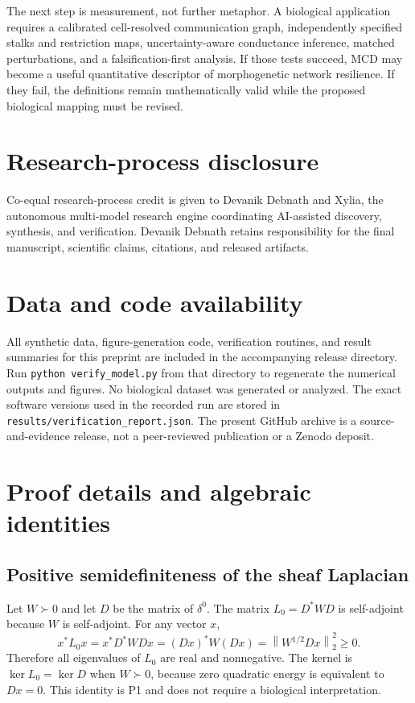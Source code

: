 \documentclass[12pt,a4paper]{article}
\newcommand{\norm}[1]{\left\lVert #1 \right\rVert}
\begin{document}
The next step is measurement, not further metaphor. A biological application requires a calibrated cell-resolved communication graph, independently specified stalks and restriction maps, uncertainty-aware conductance inference, matched perturbations, and a falsification-first analysis. If those tests succeed, MCD may become a useful quantitative descriptor of morphogenetic network resilience. If they fail, the definitions remain mathematically valid while the proposed biological mapping must be revised.

\section*{Research-process disclosure}
Co-equal research-process credit is given to Devanik Debnath and Xylia, the autonomous multi-model research engine coordinating AI-assisted discovery, synthesis, and verification. Devanik Debnath retains responsibility for the final manuscript, scientific claims, citations, and released artifacts.

\section*{Data and code availability}
All synthetic data, figure-generation code, verification routines, and result summaries for this preprint are included in the accompanying release directory. Run \texttt{python verify\_model.py} from that directory to regenerate the numerical outputs and figures. No biological dataset was generated or analyzed. The exact software versions used in the recorded run are stored in \texttt{results/verification\_report.json}. The present GitHub archive is a source-and-evidence release, not a peer-reviewed publication or a Zenodo deposit.

\appendix
\section{Proof details and algebraic identities}
\subsection{Positive semidefiniteness of the sheaf Laplacian}
Let \(W\succ0\) and let \(D\) be the matrix of \(\delta^0\). The matrix \(L_0=D^*WD\) is self-adjoint because \(W\) is self-adjoint. For any vector \(x\),
\[
x^*L_0x=x^*D^*WDx=(Dx)^*W(Dx)=\norm{W^{1/2}Dx}_2^2\geq0.
\]
Therefore all eigenvalues of \(L_0\) are real and nonnegative. The kernel is \(\ker L_0=\ker D\) when \(W\succ0\), because zero quadratic energy is equivalent to \(Dx=0\). This identity is P1 and does not require a biological interpretation.
\end{document}
